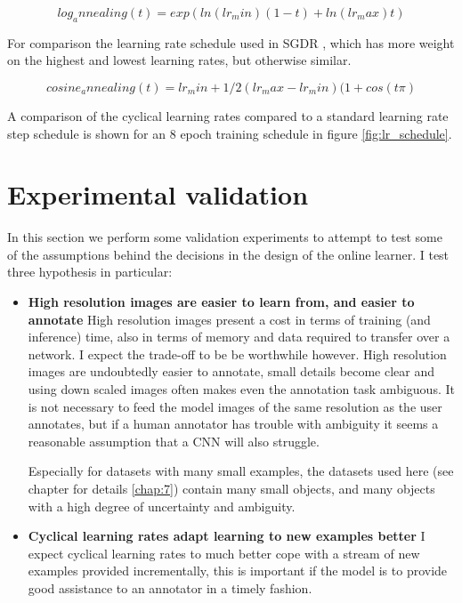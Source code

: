 \begin{equation}
log_annealing(t) = exp(ln (lr_min) (1 - t) + ln(lr_max)  t)
\label{eq:log_annealing}
\end{equation}

For comparison the learning rate schedule used in \gls{SGDR} \cite{Loshchilov2016}, which has more weight on the highest and lowest learning rates, but otherwise similar.

\begin{equation}
cosine_annealing(t) = lr_min +  1/2 (lr_max - lr_min) (1 + cos (t \pi)
\label{eq:cosine_annealing}
\end{equation}

A comparison of the cyclical learning rates compared to a standard learning rate step schedule is shown for an $8$ epoch training schedule in figure \ref{fig:lr_schedule}.


\section{Experimental validation}

In this section we perform some validation experiments to attempt to test some of the assumptions behind the decisions in the design of the online learner. I test three hypothesis in particular:

\begin{itemize}
    \item {\bf High resolution images are easier to learn from, and easier to annotate }
High resolution images present a cost in terms of training (and inference) time, also in terms of memory and data required to transfer over a network. I expect the trade-off to be be worthwhile however. High resolution images are undoubtedly easier to annotate, small details become clear and using down scaled images often makes even the annotation task ambiguous. It is not necessary to feed the model images of the same resolution as the user annotates, but if a human annotator has trouble with ambiguity it seems a reasonable assumption that a \gls{CNN} will also struggle.


Especially for datasets with many small examples, the datasets used here (see chapter for details \ref{chap:7}) contain many small objects, and many objects with a high degree of uncertainty and ambiguity. 
    
    
    
    \item {\bf Cyclical learning rates adapt learning to new examples better}
I expect cyclical learning rates to much better cope with a stream of new examples provided incrementally, this is important if the model is to provide good assistance to an annotator in a timely fashion. 

\end{itemize}


